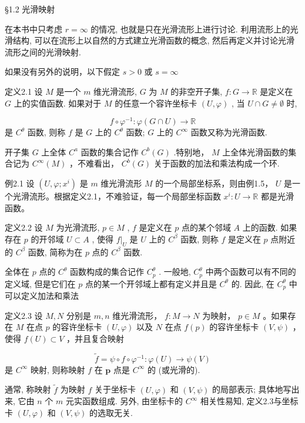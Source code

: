  §1.2 光滑映射

在本书中只考虑  $r = \infty$  的情况, 也就是只在光滑流形上进行讨论. 利用流形上的光滑结构, 可以在流形上以自然的方式建立光滑函数的概念, 然后再定义并讨论光滑流形之间的光滑映射.

如果没有另外的说明，以下假定  $s > 0$  或  $s = \infty$

定义2.1 设  $M$  是一个  $m$  维光滑流形,  $G$  为  $M$  的非空开子集,  $f: G \to \mathbb{R}$  是定义在  $G$  上的实值函数. 如果对于  $M$  的任意一个容许坐标卡  $(U, \varphi)$ , 当  $U \cap G \neq \emptyset$  时,

$$
f \circ \varphi^ {- 1}: \varphi (G \cap U) \rightarrow \mathbb {R}
$$
是  $C^\theta$  函数, 则称  $f$  是  $G$  上的  $C^\theta$  函数;  $G$  上的  $C^\infty$  函数又称为光滑函数.

开子集  $G$  上全体  $C^a$  函数的集合记作  $C^b (G)$  .特别地，  $M$  上全体光滑函数的集合记为  $C^\infty (M)$  ，不难看出，  $C^b (G)$  关于函数的加法和乘法构成一个环.

例2.1 设  $(U, \varphi; x^i)$  是  $m$  维光滑流形  $M$  的一个局部坐标系，则由例1.5， $U$  是一个光滑流形。根据定义2.1，不难验证，每一个局部坐标函数  $x^i: U \to \mathbb{R}$  都是光滑函数。

定义2.2 设  $M$  为光滑流形,  $p \in M$ ,  $f$  是定义在  $p$  点的某个邻域  $A$  上的函数. 如果存在  $p$  的开邻域  $U \subset A$ , 使得  $f|_{U}$  是  $U$  上的  $C^{\beta}$  函数, 则称  $f$  是定义在  $p$  点附近的  $C^{\beta}$  函数, 简称为在  $p$  点的  $C^{\beta}$  函数.

全体在  $p$  点的  $C^{\theta}$  函数构成的集合记作  $C_p^\theta$ . 一般地,  $C_p^\theta$  中两个函数可以有不同的定义域, 但是它们在  $p$  点的某一个开邻域上都有定义并且是  $C^{\theta}$  的. 因此, 在  $C_p^\theta$  中可以定义加法和乘法

定义2.3 设  $M, N$  分别是  $m, n$  维光滑流形， $f: M \to N$  为映射， $p \in M$ 。如果存在  $M$  在点  $p$  的容许坐标卡  $(U, \varphi)$  以及  $N$  在点  $f(p)$  的容许坐标卡  $(V, \psi)$ ，使得  $f(U) \subset V$ ，并且复合映射

$$
\tilde {f} = \psi \circ f \circ \varphi^ {- 1}: \varphi (U) \rightarrow \psi (V)
$$
是  $C^\infty$  映射, 则称映射  $f$  在  $\pmb{p}$  点是  $C^\infty$  的 (或光滑的).

通常, 称映射  $\tilde{f}$  为映射  $f$  关于坐标卡  $(U, \varphi)$  和  $(V, \psi)$  的局部表示; 具体地写出来, 它由  $n$  个  $m$  元实函数组成. 另外, 由坐标卡的  $C^\infty$  相关性易知, 定义2.3与坐标卡  $(U, \varphi)$  和  $(V, \psi)$  的选取无关.

